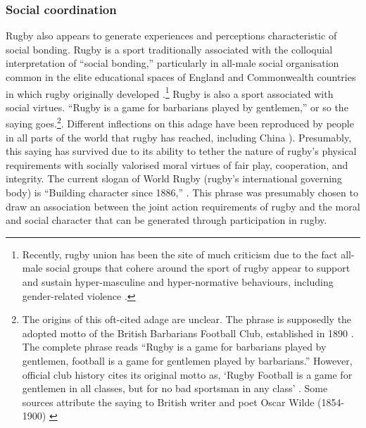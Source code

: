\begin{CJK}{UTF8}{gbsn}

\subsubsection{Social coordination}
Rugby also appears to generate experiences and perceptions characteristic of social bonding.  Rugby is a sport traditionally associated with the colloquial interpretation of ``social bonding,'' particularly in all-male social organisation common in the elite educational spaces of England and Commonwealth countries in which rugby originally developed \citep{Dunning2005,Richards2007,Collins2008}.\footnote{Recently, rugby union has been the site of much criticism due to the fact all-male social groups that cohere around the sport of rugby appear to support and sustain hyper-masculine and hyper-normative behaviours, including gender-related violence \citep{Cosslett2014}.}  Rugby is also a sport associated with social virtues.  ``Rugby is a game for barbarians played by gentlemen,'' or so the saying goes.\footnote{The origins of this oft-cited adage are unclear.  The phrase is supposedly the adopted motto of the British Barbarians Football Club, established in 1890 \citep[34]{Dunning2005}.  The complete phrase reads ``Rugby is a game for barbarians played by gentlemen, football is a game for gentlemen played by barbarians.''  However, official club history cites its original motto as, ‘Rugby Football is a game for gentlemen in all classes, but for no bad sportsman in any class' \citep[vii]{Starmer-Smith1977}.  Some sources attribute the saying to British writer and poet Oscar Wilde (1854-1900) \citep{Fleenor2015}}.
Different inflections on this adage have been reproduced by people in all parts of the world that rugby has reached, including China \citep[see][]{Taylor2010}).  Presumably, this saying has survived due to its ability to tether the nature of rugby's physical requirements with socially valorised moral virtues of fair play, cooperation, and integrity.  The current slogan of World Rugby (rugby's international governing body) is ``Building character since 1886,'' \citep{WorldRugby2017}.  This phrase was presumably chosen to draw an association between the joint action requirements of rugby and the moral and social character that can be generated through participation in rugby.


\end{CJK}
